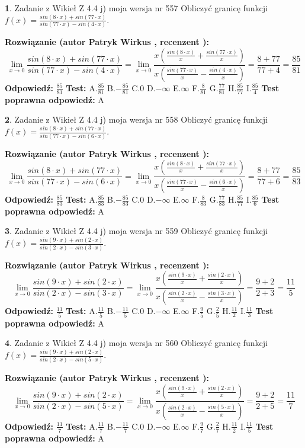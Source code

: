 \documentclass[12pt, a4paper]{article}
\theoremstyle{definition} %
\newtheorem{zad}{}
\newcommand{\zadStart}[1]{\begin{zad}#1\newline}
\newcommand{\zadStop}{\end{zad}}
\newcommand{\rozwStart}[2]{\noindent \textbf{Rozwiązanie (autor #1 , recenzent #2): }\newline}
\newcommand{\rozwStop}{\newline}
\newcommand{\odpStart}{\noindent \textbf{Odpowiedź:}\newline}
\newcommand{\odpStop}{\newline}
\newcommand{\testStart}{\noindent \textbf{Test:}\newline}
\newcommand{\testStop}{\newline}
\newcommand{\kluczStart}{\noindent \textbf{Test poprawna odpowiedź:}\newline}
\newcommand{\kluczStop}{\newline}
\begin{document}
\zadStart{Zadanie z Wikieł Z 4.4 j) moja wersja nr 557}
Obliczyć granicę funkcji $f(x)=\frac{sin(8\cdot x) +sin(77\cdot x)}{sin(77\cdot x) -sin(4\cdot x)}$.
\zadStop
\rozwStart{Patryk Wirkus}{}
$$\lim\limits_{x\to 0}\frac{sin(8\cdot x) +sin(77\cdot x)}{sin(77\cdot x) -sin(4\cdot x)}=\lim\limits_{x\to 0}\frac{x(\frac{sin(8\cdot x)}{x}+\frac{sin(77\cdot x)}{x})}{x(\frac{sin(77\cdot x)}{x}-\frac{sin(4\cdot x)}{x})}=\frac{8+77}{77+4} = \frac{85}{81}$$
\rozwStop
\odpStart
$\frac{85}{81}$
\odpStop
\testStart
A.$\frac{85}{81}$
B.$-\frac{85}{81}$
C.$0$
D.$-\infty$
E.$\infty$
F.$\frac{8}{81}$
G.$\frac{77}{81}$
H.$\frac{85}{77}$
I.$\frac{85}{4}$
\testStop
\kluczStart
A
\kluczStop



\zadStart{Zadanie z Wikieł Z 4.4 j) moja wersja nr 558}
Obliczyć granicę funkcji $f(x)=\frac{sin(8\cdot x) +sin(77\cdot x)}{sin(77\cdot x) -sin(6\cdot x)}$.
\zadStop
\rozwStart{Patryk Wirkus}{}
$$\lim\limits_{x\to 0}\frac{sin(8\cdot x) +sin(77\cdot x)}{sin(77\cdot x) -sin(6\cdot x)}=\lim\limits_{x\to 0}\frac{x(\frac{sin(8\cdot x)}{x}+\frac{sin(77\cdot x)}{x})}{x(\frac{sin(77\cdot x)}{x}-\frac{sin(6\cdot x)}{x})}=\frac{8+77}{77+6} = \frac{85}{83}$$
\rozwStop
\odpStart
$\frac{85}{83}$
\odpStop
\testStart
A.$\frac{85}{83}$
B.$-\frac{85}{83}$
C.$0$
D.$-\infty$
E.$\infty$
F.$\frac{8}{83}$
G.$\frac{77}{83}$
H.$\frac{85}{77}$
I.$\frac{85}{6}$
\testStop
\kluczStart
A
\kluczStop



\zadStart{Zadanie z Wikieł Z 4.4 j) moja wersja nr 559}
Obliczyć granicę funkcji $f(x)=\frac{sin(9\cdot x) +sin(2\cdot x)}{sin(2\cdot x) -sin(3\cdot x)}$.
\zadStop
\rozwStart{Patryk Wirkus}{}
$$\lim\limits_{x\to 0}\frac{sin(9\cdot x) +sin(2\cdot x)}{sin(2\cdot x) -sin(3\cdot x)}=\lim\limits_{x\to 0}\frac{x(\frac{sin(9\cdot x)}{x}+\frac{sin(2\cdot x)}{x})}{x(\frac{sin(2\cdot x)}{x}-\frac{sin(3\cdot x)}{x})}=\frac{9+2}{2+3} = \frac{11}{5}$$
\rozwStop
\odpStart
$\frac{11}{5}$
\odpStop
\testStart
A.$\frac{11}{5}$
B.$-\frac{11}{5}$
C.$0$
D.$-\infty$
E.$\infty$
F.$\frac{9}{5}$
G.$\frac{2}{5}$
H.$\frac{11}{2}$
I.$\frac{11}{3}$
\testStop
\kluczStart
A
\kluczStop



\zadStart{Zadanie z Wikieł Z 4.4 j) moja wersja nr 560}
Obliczyć granicę funkcji $f(x)=\frac{sin(9\cdot x) +sin(2\cdot x)}{sin(2\cdot x) -sin(5\cdot x)}$.
\zadStop
\rozwStart{Patryk Wirkus}{}
$$\lim\limits_{x\to 0}\frac{sin(9\cdot x) +sin(2\cdot x)}{sin(2\cdot x) -sin(5\cdot x)}=\lim\limits_{x\to 0}\frac{x(\frac{sin(9\cdot x)}{x}+\frac{sin(2\cdot x)}{x})}{x(\frac{sin(2\cdot x)}{x}-\frac{sin(5\cdot x)}{x})}=\frac{9+2}{2+5} = \frac{11}{7}$$
\rozwStop
\odpStart
$\frac{11}{7}$
\odpStop
\testStart
A.$\frac{11}{7}$
B.$-\frac{11}{7}$
C.$0$
D.$-\infty$
E.$\infty$
F.$\frac{9}{7}$
G.$\frac{2}{7}$
H.$\frac{11}{2}$
I.$\frac{11}{5}$
\testStop
\kluczStart
A
\kluczStop
\end{document}
